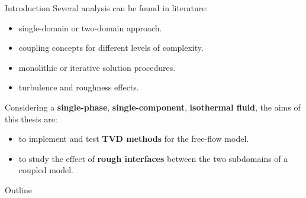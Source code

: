 \documentclass{beamer}
\begin{document}
\begin{frame}{Introduction}
Several analysis can be found in literature:
\begin{itemize}
	\item single-domain or two-domain approach.
	\item coupling concepts for different levels of complexity.
	\item monolithic or iterative solution procedures.
	\item turbulence and roughness effects.
\end{itemize}
\pause
\vspace{0.5cm}
Considering a \textbf{single-phase}, \textbf{single-component}, \textbf{isothermal fluid}, the aims of this thesis are:
\begin{itemize}
	\item to implement and test \textbf{TVD methods} for the free-flow model.
	\item to study the effect of \textbf{rough interfaces} between the two subdomains of a coupled model.
\end{itemize}
\end{frame}
\begin{frame}{Outline}
	\tableofcontents
\end{frame}
\end{document}

